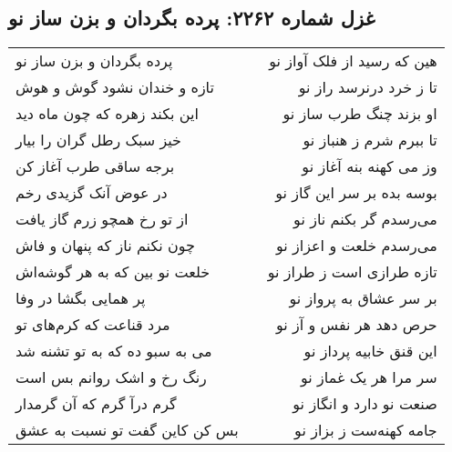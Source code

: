 \begin{center}
\section*{غزل شماره ۲۲۶۲: پرده بگردان و بزن ساز نو}
\label{sec:2262}
\begin{longtable}{l p{0.5cm} r}
پرده بگردان و بزن ساز نو
&&
هین که رسید از فلک آواز نو
\\
تازه و خندان نشود گوش و هوش
&&
تا ز خرد درنرسد راز نو
\\
این بکند زهره که چون ماه دید
&&
او بزند چنگ طرب ساز نو
\\
خیز سبک رطل گران را بیار
&&
تا ببرم شرم ز هنباز نو
\\
برجه ساقی طرب آغاز کن
&&
وز می کهنه بنه آغاز نو
\\
در عوض آنک گزیدی رخم
&&
بوسه بده بر سر این گاز نو
\\
از تو رخ همچو زرم گاز یافت
&&
می‌رسدم گر بکنم ناز نو
\\
چون نکنم ناز که پنهان و فاش
&&
می‌رسدم خلعت و اعزاز نو
\\
خلعت نو بین که به هر گوشه‌اش
&&
تازه طرازی است ز طراز نو
\\
پر همایی بگشا در وفا
&&
بر سر عشاق به پرواز نو
\\
مرد قناعت که کرم‌های تو
&&
حرص دهد هر نفس و آز نو
\\
می به سبو ده که به تو تشنه شد
&&
این قنق خابیه پرداز نو
\\
رنگ رخ و اشک روانم بس است
&&
سر مرا هر یک غماز نو
\\
گرم درآ گرم که آن گرمدار
&&
صنعت نو دارد و انگاز نو
\\
بس کن کاین گفت تو نسبت به عشق
&&
جامه کهنه‌ست ز بزاز نو
\\
\end{longtable}
\end{center}
